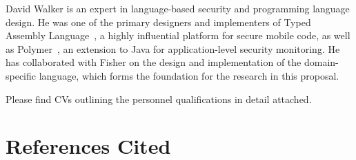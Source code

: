\documentclass[12pt]{article}
\begin{document}
David Walker is an expert in language-based security and programming
language design.  He was one of the primary designers and implementers
of Typed Assembly Language~\cite{morrisett+:tal,morrisett+:journal-stal}, 
a highly influential platform
for secure mobile code, as well as Polymer~\cite{bauer+:polymer,ligatti+:renewal,ligatti+:edit-automata}, an
extension to Java for application-level security monitoring.  He has
collaborated with Fisher on the design and implementation of the
\pads{} domain-specific language, which forms the foundation for
the research in this proposal.

Please find CVs outlining the personnel qualifications in detail attached.


\newpage
\section{References Cited}

{

}
\end{document}
